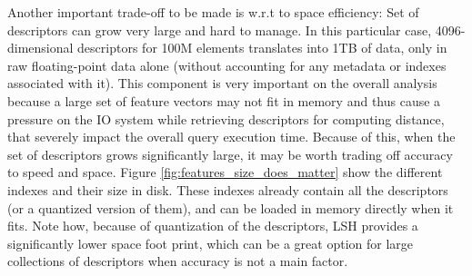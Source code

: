 Another important trade-off to be made is w.r.t to space efficiency: Set of
descriptors can grow very large and hard to manage.
In this particular case, 4096-dimensional descriptors for 100M elements
translates into 1TB of data, only in raw floating-point data alone (without
accounting for any metadata or indexes associated with it).
This component is very important on the overall analysis because a large set
of feature vectors may not fit in memory and thus cause a pressure on the IO
system while retrieving descriptors for computing distance, that severely impact
the overall query execution time.
Because of this, when the set of descriptors grows significantly large,
it may be worth trading off accuracy to speed and space.
Figure \ref{fig:features_size_does_matter} show the different indexes and
their size in disk. These indexes already contain all the descriptors (or
a quantized version of them), and can be loaded in memory directly when it fits.
Note how, because of quantization of the descriptors,
LSH provides a significantly lower space foot print, which can be a great option
for large collections of descriptors when accuracy is not a main factor.

